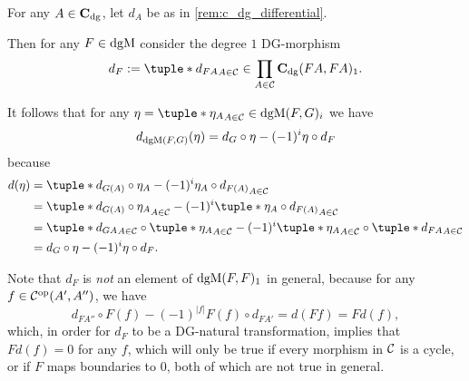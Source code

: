 \begin{remark}
    For any \( A \in \operatorname{\mathbf{C}}_{\operatorname{dg}} \), let \( d_A \) be as in \autoref{rem:c_dg_differential}.

    Then for any \( F \in \operatorname{dgM} \) consider the degree \( 1 \) DG-morphism
    \[
        d_F := \tuple*{d_{FA}}_{A \in \Cc} \in \prod_{A \in \Cc} \C_{\dg}(FA, FA)_1.
    \]

    It follows that for any \( \eta = \tuple*{\eta_A}_{A \in \Cc} \in \dgM(F, G)_i \) we have
    \[
        d_{\operatorname{dgM}(F, G)}(\eta) = d_G \circ \eta - (-1)^i \eta \circ d_F
    \]
    because
    \begin{align*}
        d(\eta) &= \tuple*{ d_{G(A)} \circ \eta_A - (-1)^i \eta_A \circ d_{F(A)} }_{A \in \Cc} \\
        &= \tuple*{ d_{G(A)} \circ \eta_A }_{A \in \Cc} - (-1)^i \tuple*{ \eta_A \circ d_{F(A)} }_{A \in \Cc} \\
        &= \tuple*{d_{G A}}_{A \in \Cc} \circ \tuple*{\eta_A}_{A \in \Cc} - (-1)^i \tuple*{\eta_A}_{A \in \Cc} \circ \tuple*{d_{F A}}_{A \in \Cc} \\
        &= d_G \circ \eta - (-1)^i \eta \circ d_F.
    \end{align*}
\end{remark}

Note that \( d_F \) is \emph{not} an element of \( \operatorname{dgM}(F, F)_1 \) in general, because for any \( f \in {\mathcal{C}}^{\operatorname{op}}(A', A'') \), we have
\[
    d_{F A''} \circ F(f) - (-1)^{|f|} F(f) \circ d_{F A'} = d(F f) = F d(f),
\]
which, in order for \( d_F \) to be a DG-natural transformation, implies that \( F d(f) = 0 \) for any \( f \), which will only be true if every morphism in \( {\mathcal{C}} \) is a cycle, or if \( F \) maps boundaries to \( 0 \), both of which are not true in general.
